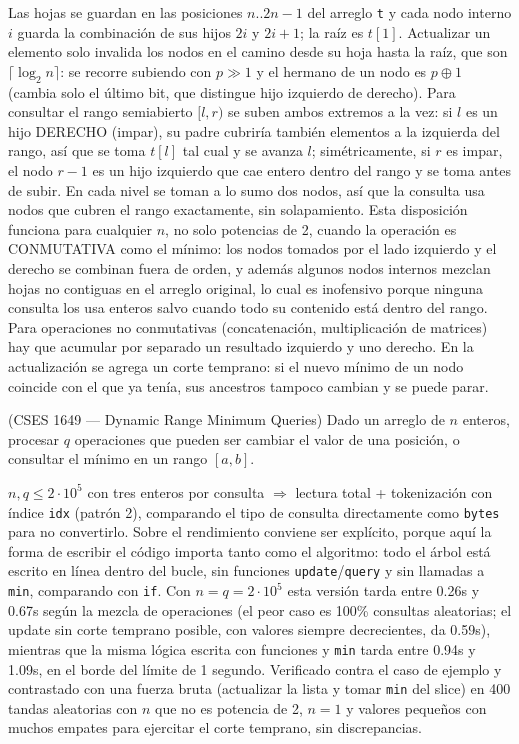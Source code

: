  Las hojas se guardan en las posiciones $n..2n-1$ del arreglo \texttt{t} y cada nodo interno $i$ guarda la combinación de sus hijos $2i$ y $2i+1$; la raíz es $t[1]$. Actualizar un elemento solo invalida los nodos en el camino desde su hoja hasta la raíz, que son $\lceil\log_2 n\rceil$: se recorre subiendo con $p \gg 1$ y el hermano de un nodo es $p \oplus 1$ (cambia solo el último bit, que distingue hijo izquierdo de derecho). Para consultar el rango semiabierto $[l, r)$ se suben ambos extremos a la vez: si $l$ es un hijo DERECHO (impar), su padre cubriría también elementos a la izquierda del rango, así que se toma $t[l]$ tal cual y se avanza $l$; simétricamente, si $r$ es impar, el nodo $r - 1$ es un hijo izquierdo que cae entero dentro del rango y se toma antes de subir. En cada nivel se toman a lo sumo dos nodos, así que la consulta usa  nodos que cubren el rango exactamente, sin solapamiento. Esta disposición funciona para cualquier $n$, no solo potencias de 2, cuando la operación es CONMUTATIVA como el mínimo: los nodos tomados por el lado izquierdo y el derecho se combinan fuera de orden, y además algunos nodos internos mezclan hojas no contiguas en el arreglo original, lo cual es inofensivo porque ninguna consulta los usa enteros salvo cuando todo su contenido está dentro del rango. Para operaciones no conmutativas (concatenación, multiplicación de matrices) hay que acumular por separado un resultado izquierdo y uno derecho. En la actualización se agrega un corte temprano: si el nuevo mínimo de un nodo coincide con el que ya tenía, sus ancestros tampoco cambian y se puede parar.


(CSES 1649 — Dynamic Range Minimum Queries) Dado un arreglo de $n$ enteros, procesar $q$ operaciones que pueden ser cambiar el valor de una posición, o consultar el mínimo en un rango $[a, b]$.

 $n, q \le 2\cdot10^5$ con tres enteros por consulta $\Rightarrow$ lectura total + tokenización con índice \texttt{idx} (patrón 2), comparando el tipo de consulta directamente como \texttt{bytes} para no convertirlo. Sobre el rendimiento conviene ser explícito, porque aquí la forma de escribir el código importa tanto como el algoritmo: todo el árbol está escrito en línea dentro del bucle, sin funciones \texttt{update}/\texttt{query} y sin llamadas a \texttt{min}, comparando con \texttt{if}. Con $n = q = 2\cdot10^5$ esta versión tarda entre \aprox{}0.26s y \aprox{}0.67s según la mezcla de operaciones (el peor caso es 100\% consultas aleatorias; el update sin corte temprano posible, con valores siempre decrecientes, da \aprox{}0.59s), mientras que la misma lógica escrita con funciones y \texttt{min} tarda entre \aprox{}0.94s y \aprox{}1.09s, en el borde del límite de 1 segundo. Verificado contra el caso de ejemplo y contrastado con una fuerza bruta (actualizar la lista y tomar \texttt{min} del slice) en 400 tandas aleatorias con $n$ que no es potencia de 2, $n = 1$ y valores pequeños con muchos empates para ejercitar el corte temprano, sin discrepancias.

